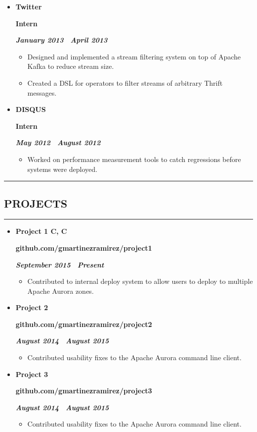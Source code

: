 \documentclass[10pt,letterpaper]{article}
\newcommand{\textbox}[1]{
  \parbox{.333\textwidth}{#1}
}
\newcommand{\CPP}
{C\nolinebreak[4]\hspace{-.05em}\raisebox{.22ex}{\footnotesize\bf ++}}
\newcommand{\sectionTitle}[1]{
  \hrule
  \vspace{-1.0em} 
  \subsection*{\uppercase{\textbf{#1}}}
  \vspace{-0.3em}
    \hrule
    \vspace{0.5em}  
}
\newcommand{\titleExperienceWithoutLocation}[4]{
  \vspace{1.0em}
  \item[]
  {
    \textbox{\textbf{#1}\hfill}\textbox{\hfil \textbf{#2}\hfil}\hfill \textbf{\emph{#3 \textendash \ #4}}
  }
}
\begin{document}
\begin{itemize}[leftmargin=*]
    \titleExperienceWithoutLocation{Twitter}{Intern}{January 2013}{April 2013}
      \begin{itemize}[label=\textbullet]
        \itemsep0em
        \item Designed and implemented a stream filtering system on top of Apache Kafka to reduce stream size.
        \item Created a DSL for operators to filter streams of arbitrary Thrift messages.
      \end{itemize}
    
    \titleExperienceWithoutLocation{DISQUS}{Intern}{May 2012}{August 2012}
      \begin{itemize}[label=\textbullet]
        \itemsep0em
        \item Worked on performance measurement tools to catch regressions before systems were deployed.
      \end{itemize}
  \end{itemize}
  

  \sectionTitle{Projects}
  \begin{itemize}[leftmargin=*]
    \parskip=-0.6em 
    \titleExperienceWithoutLocation{Project 1 C, \CPP}{github.com/gmartinezramirez/project1}{September 2015}{Present}
      \begin{itemize}[label=\textbullet]
        \itemsep0em
        \item Contributed to internal deploy system to allow users to deploy to multiple Apache Aurora zones.
      \end{itemize}
  
    \titleExperienceWithoutLocation{Project 2}{github.com/gmartinezramirez/project2}{August 2014}{August 2015}
      \begin{itemize}[label=\textbullet]
        \itemsep0em
        \item Contributed usability fixes to the Apache Aurora command line client.
      \end{itemize}

    \titleExperienceWithoutLocation{Project 3}{github.com/gmartinezramirez/project3}{August 2014}{August 2015}
      \begin{itemize}[label=\textbullet]
        \itemsep0em
        \item Contributed usability fixes to the Apache Aurora command line client.
      \end{itemize}
  \end{itemize}
\end{document}
